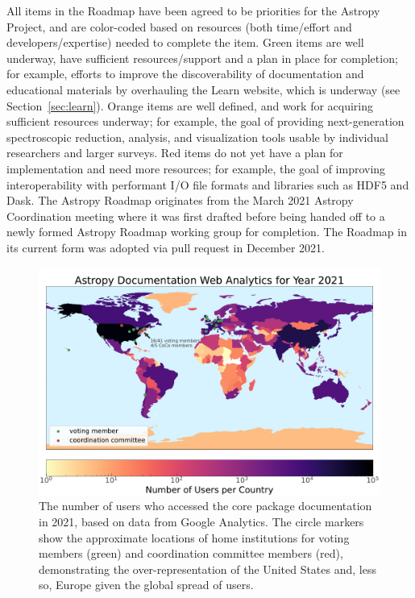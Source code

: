 \documentclass[modern]{aastex631}
\begin{document}
All items in the Roadmap have been agreed to be priorities for the Astropy
Project, and are color-coded based on resources (both time/effort and
developers/expertise) needed to complete the item. Green items are well
underway, have sufficient resources/support and a plan in place for completion;
for example, efforts to improve the discoverability of documentation and
educational materials by overhauling the Learn website, which is underway (see
Section~\ref{sec:learn}).
Orange items are well defined, and work for acquiring sufficient resources
underway; for example, the goal of providing next-generation spectroscopic
reduction, analysis, and visualization tools usable by individual researchers
and larger surveys.
Red items do not yet have a plan for implementation and need more resources; for
example, the goal of improving interoperability with performant I/O file formats
and libraries such as HDF5 and Dask.
The Astropy Roadmap originates from the March 2021 Astropy Coordination meeting
where it was first drafted before being handed off to a newly formed Astropy
Roadmap working group for completion. The Roadmap in its current form was
adopted via pull request in December 2021.

\begin{figure}[th!]
  \begin{centering}
    \includegraphics[width=\textwidth]{docu_analytics.pdf}
      \caption{
          The number of users who accessed the \astropypkg core package
          documentation in 2021, based on data from Google Analytics.
          The circle markers show the approximate locations of home institutions
          for \astropy voting members (green) and coordination committee members
          (red), demonstrating the over-representation of the United States and,
          less so, Europe given the global spread of \astropypkg users.
      }
      \label{fig:User-analytics-locations}
  \end{centering}
\end{figure}
\end{document}
